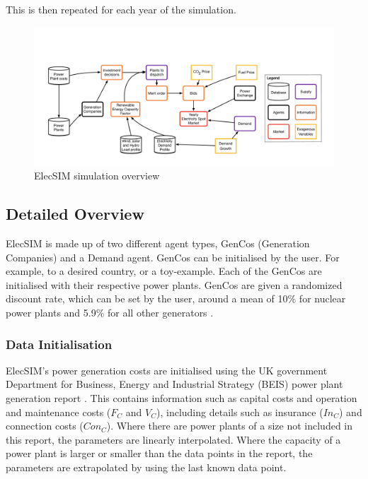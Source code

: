 This is then repeated for each year of the simulation.



\begin{figure}
	\centering
	\includegraphics[width=0.97\linewidth]{figures/low_level_system}
	\caption{ElecSIM simulation overview}
	\label{fig:lowlevelsystem}
\end{figure}


\subsection{Detailed Overview}

ElecSIM is made up of two different agent types, GenCos (Generation Companies) and a Demand agent. GenCos can be initialised by the user. For example, to a desired country, or a toy-example. Each of the GenCos are initialised with their respective power plants. GenCos are given a randomized discount rate, which can be set by the user, around a mean of 10\% for nuclear power plants \cite{Paper2012} and 5.9\% for all other generators \cite{KPMG2017}.





\subsubsection{Data Initialisation}ElecSIM's power generation costs are initialised using the UK government Department for Business, Energy and Industrial Strategy (BEIS) power plant generation report \cite{Department2016}. This contains information such as capital costs and operation and maintenance costs ($F_C$ and $V_C$), including details such as insurance ($In_C$) and connection costs ($Con_C$). Where there are power plants of a size not included in this report, the parameters are linearly interpolated. Where the capacity of a power plant is larger or smaller than the data points in the report, the parameters are extrapolated by using the last known data point.

